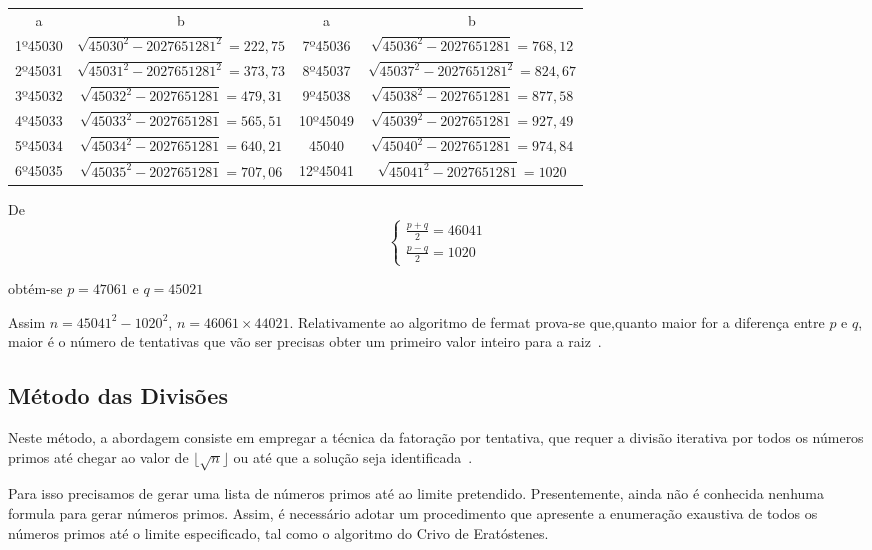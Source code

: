\begin{table}[h]
\centering
\begin{tabular}{>{\columncolor{gray!20}}cccc}
a & b & \cellcolor{gray!20}a & b\\
1º45030 & $\sqrt{45030^2-2027651281^2}=222,75$ & \cellcolor{gray!20}7º45036 & $\sqrt{45036^2-2027651281}=768,12$\\
2º45031 & $\sqrt{45031^2-2027651281^2}=373,73$  & \cellcolor{gray!20}8º45037 & $\sqrt{45037^2-2027651281^2}=824,67$ \\
3º45032 & $\sqrt{45032^2-2027651281}=479,31$ & \cellcolor{gray!20}9º45038 & $\sqrt{45038^2-2027651281}=877,58$\\
4º45033 & $\sqrt{45033^2-2027651281}=565,51$ & \cellcolor{gray!20}10º45049 & $\sqrt{45039^2-2027651281}=927,49$\\
5º45034 & $\sqrt{45034^2-2027651281}=640,21$ & \cellcolor{gray!20}45040 & $\sqrt{45040^2-2027651281}=974,84$\\
6º45035 & $\sqrt{45035^2-2027651281}=707,06$ & \cellcolor{gray!20}12º45041 & $\sqrt{45041^2-2027651281}=1020$\\
\end{tabular}
\end{table}


De 
\begin{equation}
\begin{cases}
    \frac{p+q}{2}=46041\\
    \frac{p-q}{2} = 1020
\end{cases}
\end{equation}

obtém-se $p=47061$ e $q=45021$

Assim $n=45041^2-1020^2$, $n=46061\times44021$.
Relativamente ao algoritmo de fermat prova-se que,quanto maior for a diferença entre $p$ e $q$, maior é o número de tentativas que vão ser precisas obter um primeiro valor inteiro para a raiz~\cite{Quaresma2009a}.

\subsection{Método das Divisões}

Neste método, a abordagem consiste em empregar a técnica da fatoração por tentativa, que requer a divisão iterativa por todos os números primos até chegar ao valor de $\lfloor \sqrt{n} \rfloor$ ou até que a solução seja identificada~\cite{Quaresma2009a}.

Para isso precisamos de gerar uma lista de números primos até ao limite pretendido. Presentemente, ainda não é conhecida nenhuma formula para gerar números primos. Assim, é necessário adotar um procedimento que apresente a enumeração exaustiva de todos os números primos até o limite especificado, tal como o algoritmo do Crivo de Eratóstenes.


